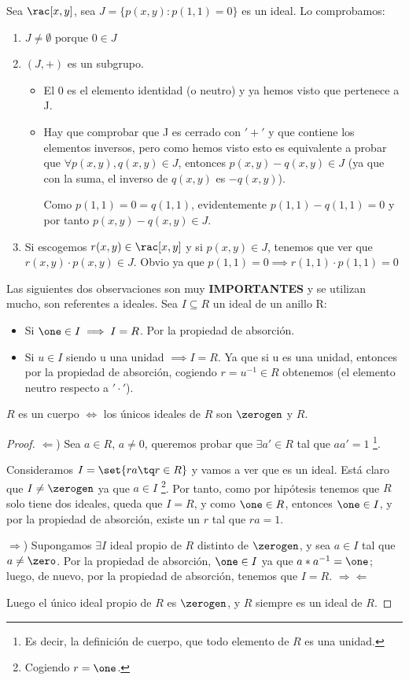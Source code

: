 \begin{example} Sea $\rac[x,y]$, sea $J=\{p(x,y): p(1,1)=0\}$ es un ideal. Lo comprobamos:
\begin{enumerate}
	\item $J \neq \emptyset$ porque $0 \in J$
	\item $(J,+)$ es un subgrupo.
	\begin{itemize}
		\item El 0 es el elemento identidad (o neutro) y ya hemos visto que pertenece a J.
		\item Hay que comprobar que J es cerrado con $'+'$ y que contiene los elementos inversos, pero como hemos visto esto es equivalente a probar que $\forall p(x,y), q(x,y) \in J$, entonces $p(x,y)-q(x,y) \in J$ (ya que con la suma, el inverso de $q(x,y)$ es $-q(x,y)$).

		Como $p(1,1)=0=q(1,1)$, evidentemente $p(1,1)-q(1,1)=0$ y por tanto $p(x,y)-q(x,y) \in J$.
	\end{itemize}
	\item Si escogemos $r(x,y) \in \rac[x,y]$ y si $p(x,y) \in J$, tenemos que ver que $r(x,y)\cdot p(x,y) \in J$. Obvio ya que $p(1,1)=0 \implies r(1,1)\cdot p(1,1) = 0$
\end{enumerate}
\end{example}

Las siguientes dos observaciones son muy \textbf{IMPORTANTES} y se utilizan mucho, son referentes a ideales. Sea $I \subseteq R$ un ideal de un anillo R:
\begin{itemize}
	\item Si $\one \in I \implies I=R$. Por la propiedad de absorción.
	\item Si $u\in I$ siendo u una unidad $\implies I=R$. Ya que si u es una unidad, entonces por la propiedad de absorción, cogiendo $r=u^{-1} \in R$ obtenemos \one (el elemento neutro respecto a $'\cdot'$).
\end{itemize}
\begin{prop}
	$R$ es un cuerpo $\iff$ los únicos ideales de $R$ son $\zerogen$ y $R$.
\end{prop}
\begin{proof}

	$\Leftarrow$) Sea $a \in R$, $a \neq 0$, queremos probar que $\exists a' \in R$ tal que $aa' = 1$ \footnote{Es decir, la definición de cuerpo, que todo elemento de $R$ es una unidad.}.

	Consideramos $I=\set{ra \tq r \in R}$ y vamos a ver que es un ideal. Está claro que $I \neq \zerogen$ ya que $a \in I$ \footnote{Cogiendo $r = \one$.}. Por tanto, como por hipótesis tenemos que $R$ solo tiene dos ideales, queda que $I=R$, y como $\one \in R$, entonces $\one \in I$, y por la propiedad de absorción, existe un $r$ tal que $ra=1$.

	$\Rightarrow$) Supongamos $\exists I$ ideal propio de $R$ distinto de $\zerogen$, y sea $a \in I$ tal que $a \neq \zero$. Por la propiedad de absorción, $\one \in I$ ya que $a*a^{-1} = \one$; luego, de nuevo, por la propiedad de absorción, tenemos que $I = R$. $\Rightarrow\Leftarrow$

	Luego el único ideal propio de $R$ es $\zerogen$, y $R$ siempre es un ideal de $R$.
\end{proof}

